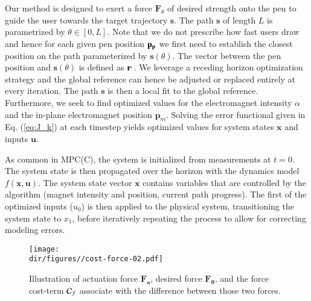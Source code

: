 Our method is designed to exert a force $\mathbf{F}_\theta$ of desired strength onto the pen to guide the user towards the target trajectory $\mathbf{s}$. 
The path $\mathbf{s}$ of length $L$ is parametrized by $\theta \in[0,L]$. 
Note that we do not prescribe how fast users draw and hence for each given pen position $\mathbf{p_p}$ we first need to establish the closest position on the path parameterized by $\mathbf{s}(\theta)$.
The vector between the pen position and $\mathbf{s}(\theta)$ is defined as $\mathbf{r_{\theta}}$.
We leverage a receding horizon optimization strategy and the global reference can hence be adjusted or replaced entirely at every iteration. 
The path $\mathbf{s}$ is then a local fit to the global reference.
Furthermore, we seek to find optimized values for the electromagnet intensity $\alpha$ and the in-plane electromagnet position $\mathbf{p}_{m}$. 
Solving the error functional given in Eq. (\ref{eq:J_k}) at each timestep yields optimized values for system states $\mathbf{x}$ and inputs $\mathbf{u}$.   
 
As common in MPC(C), the system is initialized from measurements at $t=0$. 
The system state is then propagated over the horizon with the dynamics model $f(\mathbf{x},\mathbf{u})$. 
The system state vector $\mathbf{x}$ contains variables that are controlled by the algorithm (magnet intensity and position, current path progress). 
The first of the optimized inputs ($u_0$) is then applied to the physical system, transitioning the system state to $x_1$, before iteratively repeating the process to allow for correcting modeling errors. 


\begin{figure}[!t]
    \centering
    \texttt{[image: \\dir/figures//cost-force-02.pdf]} 
    \caption{Illustration of actuation force $\mathbf{F_a}$, desired force $\mathbf{F_{\theta}}$, and the force cost-term $\mathcal{C}_f$ associate with the difference between those two forces. 
    }
    \label{fig:em_model}
\end{figure}

